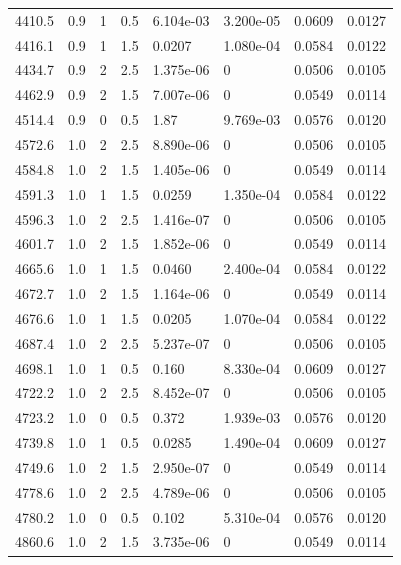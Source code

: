 \documentclass[preview]{standalone}
\begin{document}
{{{{{\begin{tabular}{L{1.2cm}C{1.2cm} C{0.3cm}C{0.5cm} C{1.4cm}C{1.4cm} C{1.4cm}C{1.4cm}}
  4410.5  &   0.9  & 1     & 0.5 &  6.104e-03  & 3.200e-05  & 0.0609 &  0.0127   \\ 
  4416.1  &   0.9  & 1     & 1.5 &  0.0207  & 1.080e-04  & 0.0584 &  0.0122   \\ 
  4434.7  &   0.9  & 2     & 2.5 &  1.375e-06  & 0  & 0.0506 &  0.0105   \\ 
  4462.9  &   0.9  & 2     & 1.5 &  7.007e-06  & 0  & 0.0549 &  0.0114   \\ 
  4514.4  &   0.9  & 0     & 0.5 &  1.87  & 9.769e-03  & 0.0576 &  0.0120   \\ 
  4572.6  &   1.0  & 2     & 2.5 &  8.890e-06  & 0  & 0.0506 &  0.0105   \\ 
  4584.8  &   1.0  & 2     & 1.5 &  1.405e-06  & 0  & 0.0549 &  0.0114   \\ 
  4591.3  &   1.0  & 1     & 1.5 &  0.0259  & 1.350e-04  & 0.0584 &  0.0122   \\ 
  4596.3  &   1.0  & 2     & 2.5 &  1.416e-07  & 0  & 0.0506 &  0.0105   \\ 
  4601.7  &   1.0  & 2     & 1.5 &  1.852e-06  & 0  & 0.0549 &  0.0114   \\ 
  4665.6  &   1.0  & 1     & 1.5 &  0.0460  & 2.400e-04  & 0.0584 &  0.0122   \\ 
  4672.7  &   1.0  & 2     & 1.5 &  1.164e-06  & 0  & 0.0549 &  0.0114   \\ 
  4676.6  &   1.0  & 1     & 1.5 &  0.0205  & 1.070e-04  & 0.0584 &  0.0122   \\ 
  4687.4  &   1.0  & 2     & 2.5 &  5.237e-07  & 0  & 0.0506 &  0.0105   \\ 
  4698.1  &   1.0  & 1     & 0.5 &  0.160  & 8.330e-04  & 0.0609 &  0.0127   \\ 
  4722.2  &   1.0  & 2     & 2.5 &  8.452e-07  & 0  & 0.0506 &  0.0105   \\ 
  4723.2  &   1.0  & 0     & 0.5 &  0.372  & 1.939e-03  & 0.0576 &  0.0120   \\ 
  4739.8  &   1.0  & 1     & 0.5 &  0.0285  & 1.490e-04  & 0.0609 &  0.0127   \\ 
  4749.6  &   1.0  & 2     & 1.5 &  2.950e-07  & 0  & 0.0549 &  0.0114   \\ 
  4778.6  &   1.0  & 2     & 2.5 &  4.789e-06  & 0  & 0.0506 &  0.0105   \\ 
  4780.2  &   1.0  & 0     & 0.5 &  0.102  & 5.310e-04  & 0.0576 &  0.0120   \\ 
  4860.6  &   1.0  & 2     & 1.5 &  3.735e-06  & 0  & 0.0549 &  0.0114   \\ 

\end{tabular}}}}}}
\end{document}
